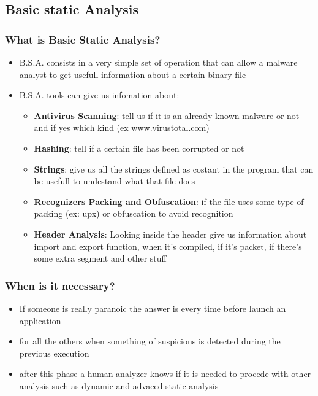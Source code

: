 \documentclass[]{beamer}
\begin{document}
	\subsection{Basic static Analysis}
		\begin{frame}
			\frametitle{What is Basic Static Analysis?}
			
			\begin{itemize}
				\item {B.S.A. consists in a very simple set of operation that can allow a malware analyst to get usefull information about a certain binary file}
				\item {B.S.A. tools can give us infomation about:}
				\begin{itemize}
					\item{\textbf{Antivirus Scanning}: tell us if it is an already known malware or not and if yes which kind (ex www.virustotal.com) }
					\item{\textbf{Hashing}: tell if a certain file has been corrupted or not}
					\item{\textbf{Strings}: give us all the strings defined as costant in the program that can be usefull to undestand what that file does}
					\item{\textbf{Recognizers Packing and Obfuscation}: if the file uses some type of packing (ex: upx) or obfuscation to avoid recognition} 
					\item{\textbf{Header Analysis}: Looking inside the header give us information about import and export function, when it's compiled, if it's packet, if there's some extra segment and other stuff }
				\end{itemize}
			\end{itemize}
		\end{frame}
		\begin{frame}
			\frametitle{When is it necessary?}
			\begin{itemize}
				\item {If someone is really paranoic the answer is every time before launch  an application }
				\item {for all the others when something of suspicious is detected during the previous execution}
				\item {after this phase a human analyzer knows if it is needed to procede with other analysis such as dynamic and advaced static analysis}
			\end{itemize}	
		\end{frame}
\end{document}
